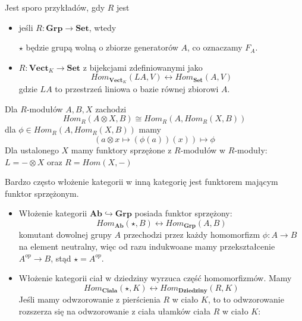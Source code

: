 \begin{example}
  \item Jest sporo przykładów, gdy $R$ jest 
    \begin{itemize}
      \item jeśli $R:\mathbf{Grp}\to\mathbf{Set}$, wtedy

        \begin{center}\end{center}

        $\star$ będzie grupą wolną o zbiorze generatorów $A$, co oznaczamy $F_A$.
      \item $R:\mathbf{Vect}_K\to\mathbf{Set}$ z bijekcjami zdefiniowanymi jako
        $$Hom_{\mathbf{Vect}_K}(LA,V)\longleftrightarrow Hom_{\mathbf{Set}}(A,V)$$
        gdzie $LA$ to przestrzeń liniowa o bazie równej zbiorowi $A$.
    \end{itemize}
  \item Dla $R$-modułów $A,B,X$ zachodzi
        $$Hom_R(A\otimes X, B)\cong Hom_R(A,Hom_R(X,B))$$
        dla $\phi\in Hom_R(A,Hom_R(X,B))$ mamy
        $$(a\otimes x\mapsto (\phi(a))(x))\mapsto \phi$$
        Dla ustalonego $X$ mamy funktory sprzężone z $R$-modułów w $R$-moduły: $L=-\otimes X$ oraz $R=Hom(X,-)$
  \item Bardzo często włożenie kategorii w inną kategorię jest funktorem mającym funktor sprzężonym.
    \begin{itemize}
      \item Włożenie kategorii $\mathbf{Ab}\hookrightarrow \mathbf{Grp}$ posiada funktor sprzężony:
      $$Hom_{\mathbf{Ab}}(\star, B)\longleftrightarrow Hom_{\mathbf{Grp}}(A, B)$$
      komutant dowolnej grupy $A$ przechodzi przez każdy homomorfizm $\phi:A\to B$ na element neutralny, więc od razu indukwoane mamy przekształcenie $A^{op}\to B$, stąd $\star=A^{op}$.
    \item Włożenie kategorii ciał w dziedziny wyrzuca część homomorfizmów. Mamy
      $$Hom_{\mathbf{Ciala}}(\star,K)\longleftrightarrow Hom_{\mathbf{Dziedziny}}(R,K)$$
      Jeśli mamy odwzorowanie z pierścienia $R$ w ciało $K$, to to odwzorowanie rozszerza się na odwzorowanie z ciała ułamków ciała $R$ w ciało $K$:
  

\end{itemize}
\end{example}
